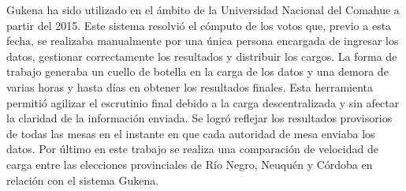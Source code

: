  Gukena ha sido utilizado en el ámbito de la Universidad Nacional del Comahue a partir del 2015. Este sistema resolvió el cómputo de los votos que, previo a esta fecha, se realizaba manualmente por una única persona encargada de ingresar los datos, gestionar correctamente los resultados y distribuir los cargos. La forma de trabajo generaba un cuello de botella en la carga de los datos y una demora de varias horas y hasta días en obtener los resultados finales.\newline
 Esta herramienta permitió agilizar el escrutinio final debido a la carga descentralizada y sin afectar la claridad de la información enviada. Se logró reflejar los resultados provisorios de todas las mesas en el instante en que cada autoridad de mesa enviaba los datos. \newline
 Por último en este trabajo se realiza una comparación de velocidad de carga entre las elecciones provinciales de Río Negro, Neuquén y Córdoba en relación con el sistema Gukena. 

\vfill
\pagebreak
